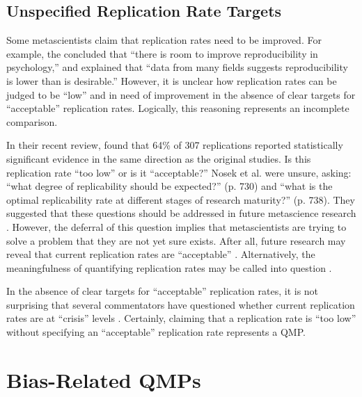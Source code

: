 \documentclass[authordate, meta]{jote-new-article}
\begin{document}
\subsection{Unspecified Replication Rate Targets}



Some metascientists claim that replication rates need to be improved. For example, the \textcite[p. 7]{Collaboration2015} concluded that “there is room to improve reproducibility in psychology,” and  \textcite[p. 1]{Munafò2017} explained that “data from many fields suggests reproducibility is lower than is desirable.” However, it is unclear how replication rates can be judged to be “low” and in need of improvement in the absence of clear targets for “acceptable” replication rates. Logically, this reasoning represents an incomplete comparison.



In their recent review,\textcite{Nosek2022} found that 64\% of 307 replications reported statistically significant evidence in the same direction as the original studies. Is this replication rate “too low” or is it “acceptable?” Nosek et al. were unsure, asking: “what degree of replicability should be expected?” (p. 730) and “what is the optimal replicability rate at different stages of research maturity?” (p. 738). They suggested that these questions should be addressed in future metascience research \parencite[see also][p. 7]{Collaboration2015}. However, the deferral of this question implies that metascientists are trying to solve a problem that they are not yet sure exists. After all, future research may reveal that current replication rates are “acceptable” \parencites{Bird2020}[p. 692]{Freiling2021}[p. 8]{Guttinger2020}{Lewandowsky2020}. Alternatively, the meaningfulness of quantifying replication rates may be called into question \parencites{Buzbas2023}{Rubin2021a}.



In the absence of clear targets for “acceptable” replication rates, it is not surprising that several commentators have questioned whether current replication rates are at “crisis” levels \parencites[e.g.,][]{Barrett2015}{Bird2020}{Buzbas2023}{Fanelli2018}{Firestein2016}{Freiling2021}{Haig2022}{Maxwell2015}{Morawski2019}{Shrout2018}{Stroebe2014}{Wood2019}. Certainly, claiming that a replication rate is “too low” without specifying an “acceptable” replication rate represents a QMP.



\section{Bias-Related QMPs}
\end{document}
